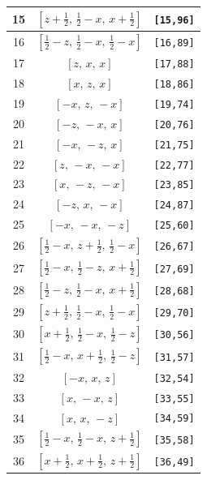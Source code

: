 \documentclass[fleqn,8pt]{jsarticle}
\begin{document}
\begin{longtable}{ccc}
15 & $\left[ z + \frac{1}{2},\, \frac{1}{2} - x,\, x + \frac{1}{2} \right]$ & {\tt [15,96]} \\ \hline
16 & $\left[ \frac{1}{2} - z,\, \frac{1}{2} - x,\, \frac{1}{2} - x \right]$ & {\tt [16,89]} \\ \hline
17 & $\left[ z,\, x,\, x \right]$ & {\tt [17,88]} \\ \hline
18 & $\left[ x,\, z,\, x \right]$ & {\tt [18,86]} \\ \hline
19 & $\left[ - x,\, z,\, - x \right]$ & {\tt [19,74]} \\ \hline
20 & $\left[ - z,\, - x,\, x \right]$ & {\tt [20,76]} \\ \hline
21 & $\left[ - x,\, - z,\, x \right]$ & {\tt [21,75]} \\ \hline
22 & $\left[ z,\, - x,\, - x \right]$ & {\tt [22,77]} \\ \hline
23 & $\left[ x,\, - z,\, - x \right]$ & {\tt [23,85]} \\ \hline
24 & $\left[ - z,\, x,\, - x \right]$ & {\tt [24,87]} \\ \hline
25 & $\left[ - x,\, - x,\, - z \right]$ & {\tt [25,60]} \\ \hline
26 & $\left[ \frac{1}{2} - x,\, z + \frac{1}{2},\, \frac{1}{2} - x \right]$ & {\tt [26,67]} \\ \hline
27 & $\left[ \frac{1}{2} - x,\, \frac{1}{2} - z,\, x + \frac{1}{2} \right]$ & {\tt [27,69]} \\ \hline
28 & $\left[ \frac{1}{2} - z,\, \frac{1}{2} - x,\, x + \frac{1}{2} \right]$ & {\tt [28,68]} \\ \hline
29 & $\left[ z + \frac{1}{2},\, \frac{1}{2} - x,\, \frac{1}{2} - x \right]$ & {\tt [29,70]} \\ \hline
30 & $\left[ x + \frac{1}{2},\, \frac{1}{2} - x,\, \frac{1}{2} - z \right]$ & {\tt [30,56]} \\ \hline
31 & $\left[ \frac{1}{2} - x,\, x + \frac{1}{2},\, \frac{1}{2} - z \right]$ & {\tt [31,57]} \\ \hline
32 & $\left[ - x,\, x,\, z \right]$ & {\tt [32,54]} \\ \hline
33 & $\left[ x,\, - x,\, z \right]$ & {\tt [33,55]} \\ \hline
34 & $\left[ x,\, x,\, - z \right]$ & {\tt [34,59]} \\ \hline
35 & $\left[ \frac{1}{2} - x,\, \frac{1}{2} - x,\, z + \frac{1}{2} \right]$ & {\tt [35,58]} \\ \hline
36 & $\left[ x + \frac{1}{2},\, x + \frac{1}{2},\, z + \frac{1}{2} \right]$ & {\tt [36,49]} \\ \hline

\end{longtable}
\end{document}
